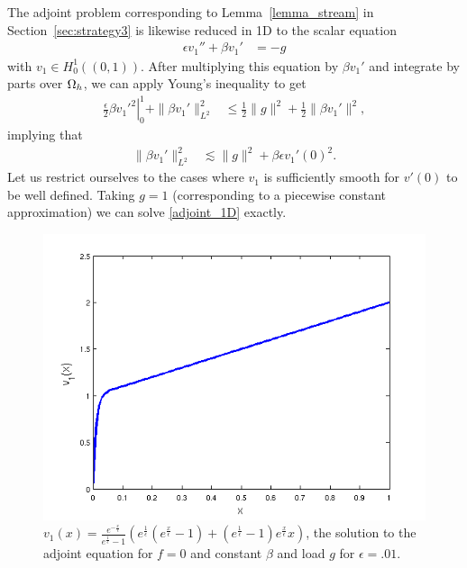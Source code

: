 The adjoint problem corresponding to Lemma~\ref{lemma_stream} in Section~\ref{sec:strategy3} is likewise reduced in 1D to the scalar equation
\begin{align}
\epsilon v_1'' + \beta v_1' &= -g \label{adjoint_1D}
\end{align}
with $v_1\in H^1_0\left((0,1)\right)$.  After multiplying this equation by $\beta v_1'$ and integrate by parts over $\Oh$, we can apply Young's inequality to get
\begin{align*}
\left.\frac{\epsilon}{2} \beta v_1'^2\right|_0^1 + \|\beta v_1'\|_{L^2}^2 &\leq \frac{1}{2}\|g\|^2 + \frac{1}{2}\|\beta v_1'\|^2,
\end{align*}
implying that
\begin{align*}
\|\beta v_1'\|_{L^2}^2 & \lesssim \|g\|^2 + {\beta \epsilon} v_1'(0)^2.
\end{align*}
Let us restrict ourselves to the cases where $v_1$ is sufficiently smooth for $v'(0)$ to be well defined.  Taking $g=1$ (corresponding to a piecewise constant approximation) we can solve \eqref{adjoint_1D} exactly. 
\begin{figure}[!h]
\centering
\includegraphics[scale=.5]{figs/testBoundary1D.png}
\caption{$v_1(x) = \frac{e^{-\frac{x}{\epsilon}}}{e^{\frac{1}{\epsilon}}-1}\left(e^{\frac{1}{\epsilon}}\left(e^{\frac{x}{\epsilon}}-1\right) + \left(e^{\frac{1}{\epsilon}}-1\right)e^{\frac{x}{\epsilon}}x\right)$, the solution to the adjoint equation for $f=0$ and constant $\beta$ and load $g$ for $\epsilon = .01$.}
\label{fig:testBoundary1D}
\end{figure}
